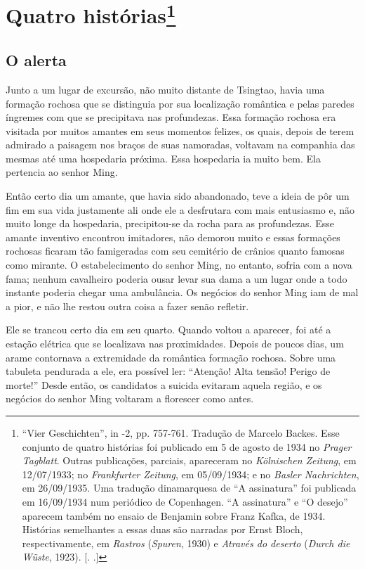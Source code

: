 \chapter{Quatro histórias\footnote[*]{``Vier Geschichten'', in  -2, pp. 757-761.
  Tradução de Marcelo Backes. Esse conjunto de quatro histórias foi
  publicado em 5 de agosto de 1934 no \emph{Prager Tagblatt}. Outras
  publicações, parciais, apareceram no \emph{Kölnischen Zeitung}, em
  12/07/1933; no \emph{Frankfurter Zeitung}, em 05/09/1934; e no
  \emph{Basler Nachrichten}, em 26/09/1935. Uma tradução dinamarquesa de
  ``A assinatura'' foi publicada em 16/09/1934 num periódico de
  Copenhagen. ``A assinatura'' e ``O desejo'' aparecem também no ensaio
  de Benjamin sobre Franz Kafka, de 1934. Histórias semelhantes a
  essas duas são narradas por Ernst Bloch, respectivamente, em
  \emph{Rastros} (\emph{Spuren}, 1930) e \emph{Através do deserto}
  (\emph{Durch die Wüste}, 1923). [. .]} }

\section{O alerta }

Junto a um lugar de excursão, não muito distante de Tsingtao, havia uma
formação rochosa que se distinguia por sua localização romântica e pelas
paredes íngremes com que se precipitava nas profundezas. Essa formação
rochosa era visitada por muitos amantes em seus momentos felizes, os
quais, depois de terem admirado a paisagem nos braços de suas namoradas,
voltavam na companhia das mesmas até uma hospedaria próxima. Essa
hospedaria ia muito bem. Ela pertencia ao senhor Ming.

Então certo dia um amante, que havia sido abandonado, teve a ideia de
pôr um fim em sua vida justamente ali onde ele a desfrutara com mais
entusiasmo e, não muito longe da hospedaria, precipitou-se da rocha para
as profundezas. Esse amante inventivo encontrou imitadores, não demorou
muito e essas formações rochosas ficaram tão famigeradas com seu
cemitério de crânios quanto famosas como mirante. O estabelecimento do
senhor Ming, no entanto, sofria com a nova fama; nenhum cavalheiro
poderia ousar levar sua dama a um lugar onde a todo instante poderia
chegar uma ambulância. Os negócios do senhor Ming iam de mal a pior, e
não lhe restou outra coisa a fazer senão refletir.

Ele se trancou certo dia em seu quarto. Quando voltou a aparecer, foi
até a estação elétrica que se localizava nas proximidades. Depois de
poucos dias, um arame contornava a extremidade da romântica formação
rochosa. Sobre uma tabuleta pendurada a ele, era possível ler:
``Atenção! Alta tensão! Perigo de morte!'' Desde então, os candidatos a
suicida evitaram aquela região, e os negócios do senhor Ming voltaram a
florescer como antes.


